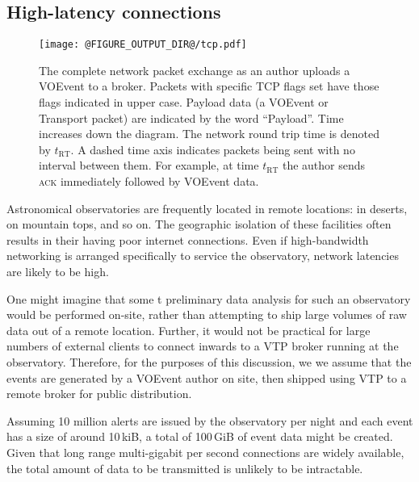 \documentclass[5p,authoryear]{elsarticle}
\begin{document}
\subsection{High-latency connections}
\label{sec:perf:highlatency}

\begin{figure}
  \begin{center}
  \texttt{[image: @FIGURE\_OUTPUT\_DIR@/tcp.pdf]}
  \end{center}

  \caption{The complete network packet exchange as an author uploads a VOEvent
  to a broker. Packets with specific TCP flags set have those flags indicated
  in upper case. Payload data (a VOEvent or Transport packet) are indicated
  by the word ``Payload''. Time increases down the diagram. The network round
  trip time is denoted by $t_\mathrm{RT}$. A dashed time axis indicates
  packets being sent with no interval between them. For example, at time
  $t_\mathrm{RT}$ the author sends \textsc{ack} immediately followed by
  VOEvent data.}

  \label{fig:tcp}
\end{figure}

Astronomical observatories are frequently located in remote locations: in
deserts, on mountain tops, and so on. The geographic isolation of these
facilities often results in their having poor internet connections. Even if
high-bandwidth networking is arranged specifically to service the observatory,
network latencies are likely to be high.

One might imagine that some t preliminary data analysis for such an
observatory would be performed on-site, rather than attempting to ship large
volumes of raw data out of a remote location. Further, it would not be
practical for large numbers of external clients to connect inwards to a VTP
broker running at the observatory. Therefore, for the purposes of this
discussion, we we assume that the events are generated by a VOEvent author on
site, then shipped using VTP to a remote broker for public distribution.

Assuming 10 million alerts are issued by the observatory per night and each
event has a size of around 10\,kiB, a total of 100\,GiB of event data might be
created. Given that long range multi-gigabit per second connections are widely
available, the total amount of data to be transmitted is unlikely to be
intractable.
\end{document}
